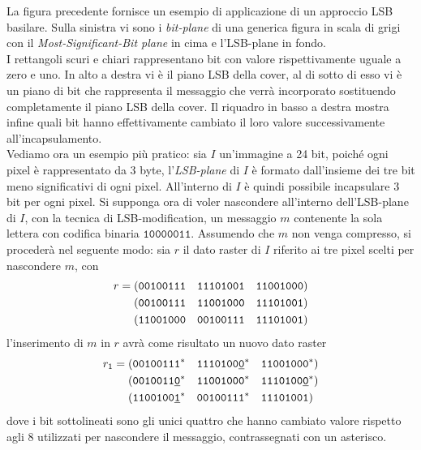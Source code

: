 La figura precedente fornisce un esempio di applicazione di un approccio LSB basilare. Sulla sinistra vi sono i \textit{bit-plane} di una generica figura in scala di grigi con il \textit{Most-Significant-Bit plane} in cima e l'LSB-plane in fondo.\\I rettangoli scuri e chiari rappresentano bit con valore rispettivamente uguale a zero e uno. In alto a destra vi è il piano LSB della cover, al di sotto di esso vi è un piano di bit che rappresenta il messaggio che verrà incorporato sostituendo completamente il piano LSB della cover. Il riquadro in basso a destra mostra infine quali bit hanno effettivamente cambiato il loro valore successivamente all'incapsulamento.\\Vediamo ora un esempio più pratico: sia $I$ un'immagine a 24 bit, poiché ogni pixel è rappresentato da 3 byte, l'\textit{LSB-plane} di $I$ è formato dall'insieme dei tre bit meno significativi di ogni pixel. All'interno di $I$ è quindi possibile incapsulare 3 bit per ogni pixel. Si supponga ora di voler nascondere all'interno dell'LSB-plane di $I$, con la tecnica di LSB-modification, un messaggio $m$ contenente la sola lettera  con codifica binaria $\mathtt{10000011}$. Assumendo che $m$ non venga compresso, si procederà nel seguente modo: sia $r$ il dato raster di $I$ riferito ai tre pixel scelti per nascondere $m$, con
\begin{equation}
\notag
\begin{split}
r= \; &(\mathtt{00100111} \quad \mathtt{11101001} \quad \mathtt{11001000})\\&(\mathtt{00100111} \quad \mathtt{11001000} \quad \mathtt{11101001})\\&(\mathtt{11001000} \quad \mathtt{00100111} \quad \mathtt{11101001})
\end{split}
\end{equation}
l'inserimento di $m$ in $r$ avrà come risultato un nuovo dato raster
\begin{equation}
\notag
\begin{split}
r_1= \; &(\mathtt{00100111^*} \quad \mathtt{1110100\underline 0 ^*} \quad \mathtt{11001000^*})\\&(\mathtt{0010011\underline 0 ^*} \quad \mathtt{11001000^*} \quad \mathtt{1110100\underline 0 ^*})\\&(\mathtt{1100100\underline{1}^*} \quad \mathtt{00100111^*} \quad \mathtt{11101001})
\end{split}
\end{equation}
dove i bit sottolineati sono gli unici quattro che hanno cambiato valore rispetto agli 8 utilizzati per nascondere il messaggio, contrassegnati con un asterisco. %
